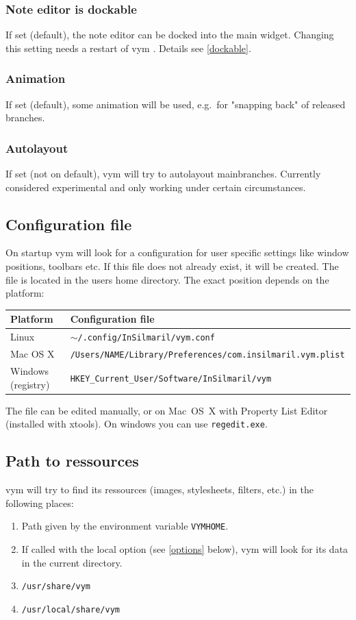 \documentclass[12pt,a4paper]{article}
\newcommand{\vym}{{\sc vym }}
\begin{document}
\begin{appendix}
\subsubsection*{Note editor is dockable}
    If set (default), the note editor can be docked into the main
    widget. Changing this setting needs a restart of \vym. Details see
    \ref{dockable}.

\subsubsection*{Animation}
    If set (default), some animation will be used, e.g.\ for "snapping
    back" of released branches.

\subsubsection*{Autolayout} %
    If set (not on default), \vym will try to autolayout mainbranches.
    Currently considered experimental and only working under certain
    circumstances. 

\subsection{Configuration file}
On startup \vym will look for a configuration for user specific settings
like window positions, toolbars etc. If this file does not already
exist, it will be created. The file is located in the users home
directory. The exact position depends on the platform:
\begin{center}
\begin{tabular}{ll}
    {\bf Platform}  & {\bf Configuration file} \\ \hline
    Linux              & {\tt $\sim$/.config/InSilmaril/vym.conf  } \\
    Mac OS X           & {\tt /Users/NAME/Library/Preferences/com.insilmaril.vym.plist  } \\
    Windows (registry) & {\tt HKEY\_Current\_User/Software/InSilmaril/vym  } \\
\end{tabular}
\end{center}
The file can be edited manually, or on Mac~OS~X with Property List
Editor (installed with xtools). On windows you can use {\tt regedit.exe}.

\subsection{Path to ressources}
\vym will try to find its ressources (images, stylesheets, filters,
etc.) in the following places:
\begin{enumerate}
    \item Path given by the environment variable {\tt VYMHOME}.
    \item If called with the local option (see \ref{options} below),
          \vym will look for its data in the current directory.
    \item {\tt /usr/share/vym}
    \item {\tt /usr/local/share/vym}
\end{enumerate}


\end{appendix}
\end{document}
